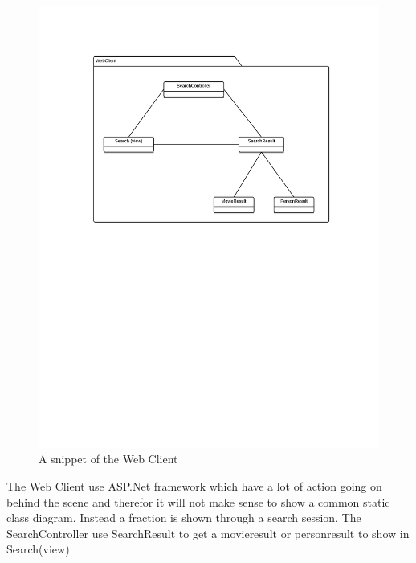 \begin{figure}[H]
\includegraphics[scale=0.2]{img/WebClientSubsystemSnippet.png}
\caption{A snippet of the Web Client}
\label{fig:WebClientSubsystem}
\end{figure}

The Web Client use ASP.Net framework which have a lot of action going on behind the scene and therefor it will not make sense to show a common static class diagram. Instead  a fraction is shown through a search session. The SearchController use SearchResult to get a movieresult or personresult to show in Search(view)\\



